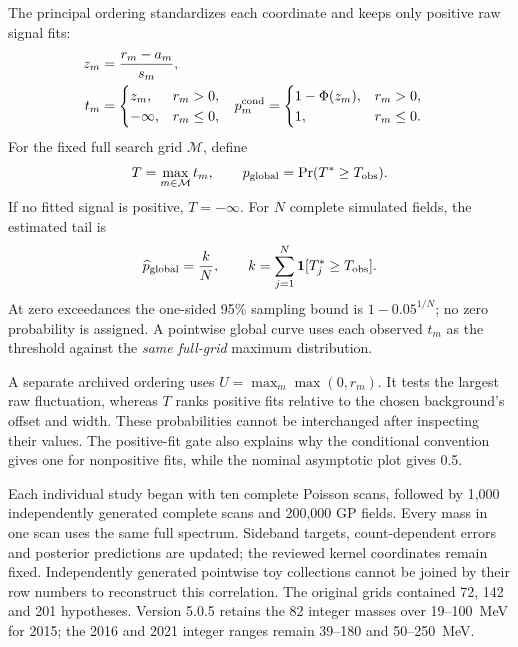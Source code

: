 The principal ordering standardizes each coordinate and keeps only
positive raw signal fits:
\begin{align}
 z_m&=\frac{r_m-a_m}{s_m},\\
 t_m&=\begin{cases}z_m,&r_m>0,\\-\infty,&r_m\leq0,\end{cases}
 &p_m^{\rm cond}&=\begin{cases}1-\Phi(z_m),&r_m>0,\\1,&r_m\leq0.\end{cases}
 \label{eq:v501-local-ordering}
\end{align}
For the fixed full search grid $\mathcal M$, define
\begin{equation}
 T=\max_{m\in\mathcal M}t_m,
 \qquad
 p_{\rm global}=\Pr(T^*\geq T_{\rm obs}).
 \label{v5-eq:global-ordering}
\end{equation}
If no fitted signal is positive, $T=-\infty$. For $N$ complete simulated
fields, the estimated tail is
\begin{equation}
 \widehat p_{\rm global}=\frac{k}{N},
 \qquad k=\sum_{j=1}^{N}\mathbf1[T_j^*\geq T_{\rm obs}].
 \label{eq:v501-global-mc-tail}
\end{equation}
At zero exceedances the one-sided 95\% sampling bound is
$1-0.05^{1/N}$; no zero probability is assigned. A pointwise global curve
uses each observed $t_m$ as the threshold against the \emph{same full-grid}
maximum distribution.

A separate archived ordering uses $U=\max_m\max(0,r_m)$. It tests the
largest raw fluctuation, whereas $T$ ranks positive fits relative to the
chosen background's offset and width. These probabilities cannot be
interchanged after inspecting their values. The positive-fit gate also
explains why the conditional convention gives one for nonpositive fits,
while the nominal asymptotic plot gives 0.5.

Each individual study began with ten complete Poisson scans, followed by
1,000 independently generated complete scans and 200,000 GP fields.
Every mass in one scan uses the same full spectrum. Sideband targets,
count-dependent errors and posterior predictions are updated; the reviewed
kernel coordinates remain fixed. Independently generated pointwise toy
collections cannot be joined by their row numbers to reconstruct this
correlation. The original grids contained 72, 142 and 201 hypotheses.
Version 5.0.5 retains the 82 integer masses over 19--100~MeV for 2015; the
2016 and 2021 integer ranges remain 39--180 and 50--250~MeV.

